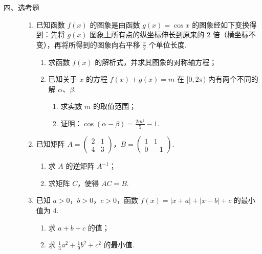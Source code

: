 \begin{description}

    \item[四、选考题]

    \begin{enumerate}[leftmargin=5pt]

      \addtocounter{enumi}{+20}

        \item 已知函数 \(f(x)\) 的图象是由函数 \(g(x) = \cos x\) 的图象经如下变换得到：先将 \(g(x)\) 图象上所有点的纵坐标伸长到原来的 \(2\) 倍（横坐标不变），再将所得到的图象向右平移 \(\frac{\pi}{2}\) 个单位长度.
\begin{enumerate}
\item 求函数 \(f(x)\) 的解析式，并求其图象的对称轴方程；
\item 已知关于 \(x\) 的方程 \(f(x)+g(x)=m\) 在 \([0,2\pi)\) 内有两个不同的解 \(\alpha\)、\(\beta\).
\begin{enumerate}
\item 求实数 \(m\) 的取值范围；
\item 证明：\(\cos(\alpha-\beta)=\frac{2m^{2}}{5}-1\).
\end{enumerate}
\end{enumerate}

        \item 已知矩阵 \(A=\begin{pmatrix}2&1\\4&3\end{pmatrix}\)，\(B=\begin{pmatrix}1&1\\0&-1\end{pmatrix}\).
\begin{enumerate}
\item 求 \(A\) 的逆矩阵 \( A^{-1} \)；
\item 求矩阵 \(C\)，使得 \(AC = B\).
\end{enumerate}

        \item 已知 \(a > 0\)，\(b > 0\)，\(c > 0\)，函数 \(f(x) = |x + a| + |x - b| + c\) 的最小值为 \(4\).
\begin{enumerate}
\item 求 \(a + b + c\) 的值；
\item 求 \(\frac{1}{4}a^{2}+\frac{1}{9}b^{2}+c^{2}\) 的最小值.
\end{enumerate}

    \end{enumerate}

\end{description}


